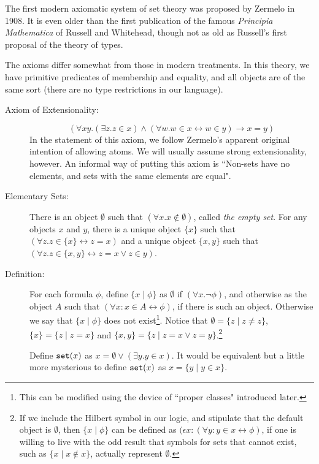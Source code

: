 \documentclass[12pt]{book}
\begin{document}
The first modern axiomatic system of set theory was proposed by
Zermelo in 1908.  It is even older than the first publication of the
famous {\em Principia Mathematica\/} of Russell and Whitehead, though
not as old as Russell's first proposal of the theory of types.

The axioms differ somewhat from those in modern treatments.  In this
theory, we have primitive predicates of membership and equality, and
all objects are of the same sort (there are no type restrictions in
our language).

\begin{description}

\item[Axiom of Extensionality:]  $$(\forall xy.(\exists z.z \in x) \wedge (\forall w.w \in x \leftrightarrow w \in y) \rightarrow x=y)$$  In the statement of this axiom, we follow Zermelo's apparent original intention of allowing atoms.  We will usually assume strong extensionality, however.  An informal way of putting this axiom is ``Non-sets have no elements, and sets with the same elements are equal".

\item[Elementary Sets:] There is an object $\emptyset$ such that $(\forall x.x \not\in  \emptyset)$, called {\em the empty set\/}.  For any
objects $x$ and $y$, there is a unique object $\{x\}$ such that $(\forall z.z\in \{x\} \leftrightarrow z=x)$ and a unique object $\{x,y\}$ such that
$(\forall z.z \in \{x,y\} \leftrightarrow z=x \vee z \in y)$.

\item[Definition:]  For each formula $\phi$, define $\{x \mid \phi\}$ as $\emptyset$ if $(\forall x.\neg \phi)$, and otherwise as the object $A$
such that $(\forall x:x \in A \leftrightarrow \phi)$, if there is such an object.  Otherwise we say that $\{x \mid \phi\}$ does not exist\footnote{This can be modified using the device of ``proper classes" introduced later.}.  Notice that
$\emptyset=\{z\mid z \neq z\}$, $\{x\} = \{z\mid z=x\}$ and $\{x,y\} = \{z\mid z=x \vee z=y\}$.\footnote{If we include the Hilbert symbol in our logic, and stipulate that the default object is $\emptyset$, then $\{x \mid \phi\}$ can be defined as $(\epsilon x:(\forall y:y \in x \leftrightarrow \phi)$, if one is willing to live with the odd result that symbols for sets that cannot exist, such as $\{x \mid x \not\in x\}$, actually represent $\emptyset$.}

Define ${\tt set}(x)$ as $x=\emptyset \vee (\exists y.y \in x)$.  It would be equivalent but a little more mysterious to define ${\tt set}(x)$ as $x=\{y \mid y\in x\}$.


\end{description}
\end{document}

